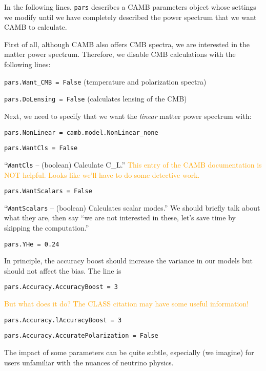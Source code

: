 
In the following lines, \verb|pars| describes a CAMB parameters object whose
settings we modify until we have completely described the power spectrum that
we want CAMB to calculate.

First of all, although CAMB also offers CMB spectra, we are interested in the
matter power spectrum. Therefore, we disable CMB calculations with the 
following lines:

\verb|pars.Want_CMB = False| (temperature and polarization spectra)

\verb|pars.DoLensing = False| (calculates lensing of the CMB)

Next, we need to specify that we want the \textit{linear} matter power 
spectrum with:

\verb|pars.NonLinear = camb.model.NonLinear_none|




\verb|pars.WantCls = False|

``\verb|WantCls| – (boolean) Calculate C\_L.'' \textcolor{orange}{This entry 
of
the CAMB documentation is NOT helpful. Looks like we’ll have to do some
detective work.}

\verb|pars.WantScalars = False|

``\verb|WantScalars| – (boolean) Calculates scalar modes.'' We should briefly 
talk about what they are, then say ``we are not interested in these, let's 
save time by skipping the computation.''



\verb|pars.YHe = 0.24|

In principle, the accuracy boost should increase the variance in our models but should not affect the bias. The line is

\verb|pars.Accuracy.AccuracyBoost = 3|

\textcolor{orange}{But what does it do? The CLASS citation may have some
useful information!}

\verb|pars.Accuracy.lAccuracyBoost = 3|

\verb|pars.Accuracy.AccuratePolarization = False|


The impact of some parameters can be quite subtle, especially (we imagine)
for users unfamiliar with the nuances of neutrino physics.

